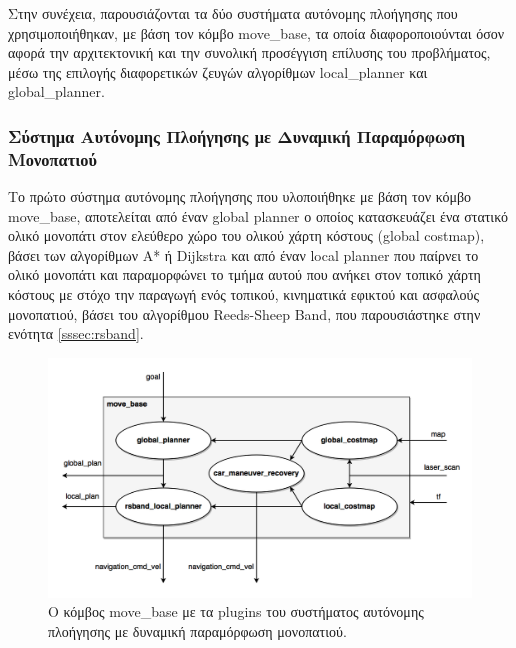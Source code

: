 \bigskip
Στην συνέχεια, παρουσιάζονται τα δύο συστήματα αυτόνομης πλοήγησης που χρησιμοποιήθηκαν, με βάση τον κόμβο move{\_}base, τα οποία διαφοροποιούνται όσον αφορά την αρχιτεκτονική και την συνολική προσέγγιση επίλυσης του προβλήματος, μέσω της επιλογής διαφορετικών ζευγών αλγορίθμων local{\_}planner και global{\_}planner.
	
\subsubsection{Σύστημα Αυτόνομης Πλοήγησης με Δυναμική Παραμόρφωση Μονοπατιού}
Το πρώτο σύστημα αυτόνομης πλοήγησης που υλοποιήθηκε με βάση τον κόμβο move{\_}base, αποτελείται από έναν global planner ο οποίος κατασκευάζει ένα στατικό ολικό μονοπάτι στον ελεύθερο χώρο του ολικού χάρτη κόστους (global costmap), βάσει των αλγορίθμων A* ή Dijkstra και από έναν local planner που παίρνει το ολικό μονοπάτι και παραμορφώνει το τμήμα αυτού που ανήκει στον τοπικό χάρτη κόστους με στόχο την παραγωγή ενός τοπικού, κινηματικά εφικτού και ασφαλούς μονοπατιού, βάσει του αλγορίθμου Reeds-Sheep Band, που παρουσιάστηκε στην ενότητα \ref{sssec:rsband}.

\begin{figure}[!ht]
	\centering
	\includegraphics[width=\linewidth]{Chapters/Chapter4/Figures/navigation_1_plugins.png}
	\caption{Ο κόμβος move{\_}base με τα plugins του συστήματος αυτόνομης πλοήγησης με δυναμική παραμόρφωση μονοπατιού.}
	\label{fig:navigation_1_plugins}
\end{figure}

